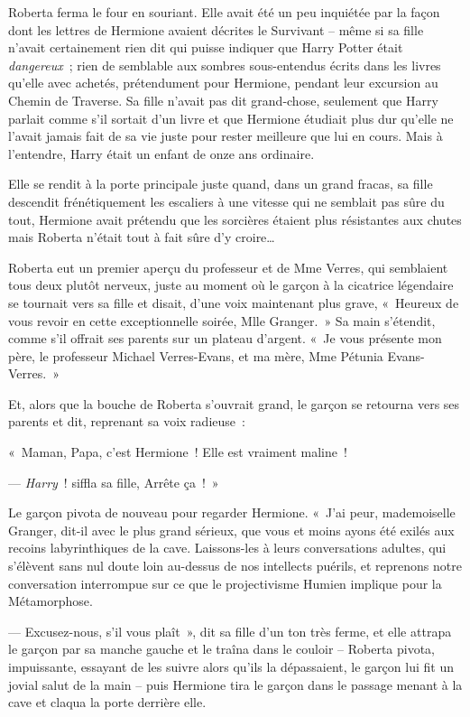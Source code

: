 Roberta ferma le four en souriant. Elle avait été un peu inquiétée par la façon dont les lettres de Hermione avaient décrites le Survivant -- même si sa fille n'avait certainement rien dit qui puisse indiquer que Harry Potter était \emph{dangereux}~; rien de semblable aux sombres sous-entendus écrits dans les livres qu'elle avec achetés, prétendument pour Hermione, pendant leur excursion au Chemin de Traverse. Sa fille n'avait pas dit grand-chose, seulement que Harry parlait comme s'il sortait d'un livre et que Hermione étudiait plus dur qu'elle ne l'avait jamais fait de sa vie juste pour rester meilleure que lui en cours. Mais à l'entendre, Harry était un enfant de onze ans ordinaire.

Elle se rendit à la porte principale juste quand, dans un grand fracas, sa fille descendit frénétiquement les escaliers à une vitesse qui ne semblait pas sûre du tout, Hermione avait prétendu que les sorcières étaient plus résistantes aux chutes mais Roberta n'était tout à fait sûre d'y croire…

Roberta eut un premier aperçu du professeur et de Mme Verres, qui semblaient tous deux plutôt nerveux, juste au moment où le garçon à la cicatrice légendaire se tournait vers sa fille et disait, d'une voix maintenant plus grave, «~Heureux de vous revoir en cette exceptionnelle soirée, Mlle Granger.~» Sa main s'étendit, comme s'il offrait ses parents sur un plateau d'argent. «~Je vous présente mon père, le professeur Michael Verres-Evans, et ma mère, Mme Pétunia Evans-Verres.~»

Et, alors que la bouche de Roberta s'ouvrait grand, le garçon se retourna vers ses parents et dit, reprenant sa voix radieuse~:

«~Maman, Papa, c'est Hermione~! Elle est vraiment maline~!

--- \emph{Harry}~! siffla sa fille, Arrête ça~!~»

Le garçon pivota de nouveau pour regarder Hermione. «~J'ai peur, mademoiselle Granger, dit-il avec le plus grand sérieux, que vous et moins ayons été exilés aux recoins labyrinthiques de la cave. Laissons-les à leurs conversations adultes, qui s'élèvent sans nul doute loin au-dessus de nos intellects puérils, et reprenons notre conversation interrompue sur ce que le projectivisme Humien implique pour la Métamorphose.

--- Excusez-nous, s'il vous plaît~», dit sa fille d'un ton très ferme, et elle attrapa le garçon par sa manche gauche et le traîna dans le couloir -- Roberta pivota, impuissante, essayant de les suivre alors qu'ils la dépassaient, le garçon lui fit un jovial salut de la main -- puis Hermione tira le garçon dans le passage menant à la cave et claqua la porte derrière elle.

